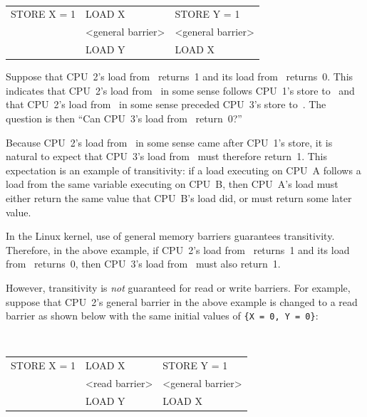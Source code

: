\vspace{5pt}
\begin{minipage}[t]{\columnwidth}
\tt
\scriptsize
\begin{tabular}{l|l|l}
	\nf{CPU 1}	& \nf{CPU 2}		& \nf{CPU 3} \\
	\hline
	STORE X = 1	& LOAD X		& STORE Y = 1 \\
			& <general barrier>	& <general barrier> \\
			& LOAD Y		& LOAD X \\
\end{tabular}
\end{minipage}
\vspace{5pt}

Suppose that CPU~2's load from~ returns~1 and its load from~ returns~0.
This indicates that CPU~2's load from~ in some sense follows CPU~1's
store to~ and that CPU~2's load from~ in some sense preceded CPU~3's
store to~.  The question is then ``Can CPU~3's load from~ return~0?''

Because CPU~2's load from~ in some sense came after CPU~1's store, it
is natural to expect that CPU~3's load from~ must therefore return~1.
This expectation is an example of transitivity: if a load executing on
CPU~A follows a load from the same variable executing on CPU~B, then
CPU~A's load must either return the same value that CPU~B's load did,
or must return some later value.

In the Linux kernel, use of general memory barriers guarantees
transitivity.  Therefore, in the above example, if CPU~2's load from~
returns~1 and its load from~ returns~0, then CPU~3's load from~ must
also return~1.

However, transitivity is {\em not} guaranteed for read or write barriers.
For example, suppose that CPU~2's general barrier in the above example
is changed to a read barrier as shown below with the same initial values of
{\tt \{X~=~0, Y~=~0\}}:

\vspace{5pt}
\begin{minipage}[t]{\columnwidth}
\tt
\scriptsize
\begin{tabular}{l|l|l}
	\nf{CPU 1}	& \nf{CPU 2}		& \nf{CPU 3} \\
	\hline
	STORE X = 1	& LOAD X		& STORE Y = 1 \\
			& <read barrier>	& <general barrier> \\
			& LOAD Y		& LOAD X \\
\end{tabular}
\end{minipage}
\vspace{5pt}

